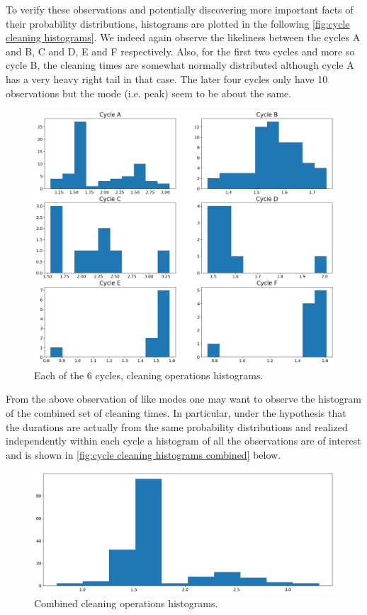 \documentclass[../Thesis.tex]{subfiles}
\begin{document}
To verify these observations and potentially discovering more important facts of their probability distributions, histograms are plotted in the following \autoref{fig:cycle cleaning histograms}. We indeed again observe the likeliness between the cycles A and B, C and D, E and F respectively. Also, for the first two cycles and more so cycle B, the cleaning times are somewhat normally distributed although cycle A has a very heavy right tail in that case. The later four cycles only have 10 observations but the mode (i.e. peak) seem to be about the same.

\begin{figure}[h]
    \centering
    \includegraphics[width=0.8\linewidth]{figures/Multiple cycles data/Cleaning batches histograms.png}
    \caption{Each of the 6 cycles, cleaning operations histograms.}
    \label{fig:cycle cleaning histograms}
\end{figure}

From the above observation of like modes one may want to observe the histogram of the combined set of cleaning times. In particular, under the hypothesis that the durations are actually from the same probability distributions and realized independently within each cycle a histogram of all the observations are of interest and is shown in \autoref{fig:cycle cleaning histograms combined} below.


\begin{figure}[H]
    \centering
    \includegraphics[width=0.8\linewidth]{figures/Multiple cycles data/Cleaning batches histograms combined.png}
    \caption{Combined cleaning operations histograms.}
    \label{fig:cycle cleaning histograms combined}
\end{figure}
\end{document}
